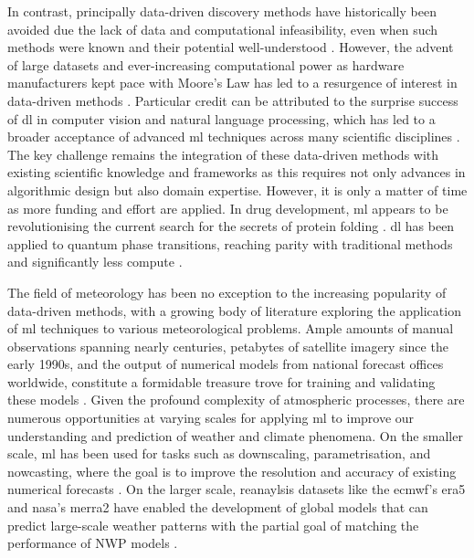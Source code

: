 In contrast, principally data-driven discovery methods have historically been avoided due the lack of data and computational infeasibility, even when such methods were known and their potential well-understood \citep{Rosenblatt1957,Rumelhart1986}. However, the advent of large datasets and ever-increasing computational power as hardware manufacturers kept pace with Moore's Law  has led to a resurgence of interest in data-driven methods \citep{Haber2025}. Particular credit can be attributed to the surprise success of \acrfull{dl} in computer vision and natural language processing, which has led to a broader acceptance of advanced \acrfull{ml} techniques across many scientific disciplines \citep{Haber2025,Krizhevsky2017}. The key challenge remains the integration of these data-driven methods with existing scientific knowledge and frameworks as this requires not only advances in algorithmic design but also domain expertise. However, it is only a matter of time as more funding and effort are applied. In drug development, \acrfull{ml} appears to be revolutionising the current search for the secrets of protein folding \citep{Jumper2021}. \acrshort{dl} has been applied to quantum phase transitions, reaching parity with traditional methods and significantly less compute \citep{Huembeli2018}.

The field of meteorology has been no exception to the increasing popularity of data-driven methods, with a growing body of literature exploring the application of \acrshort{ml} techniques to various meteorological problems. Ample amounts of manual observations spanning nearly centuries, petabytes of satellite imagery since the early 1990s, and the output of numerical models from national forecast offices worldwide, constitute a formidable treasure trove for training and validating these models \citep{Bracco2024,Waqas2024,Zhang2025}. Given the profound complexity of atmospheric processes, there are numerous opportunities at varying scales for applying \acrshort{ml} to improve our understanding and prediction of weather and climate phenomena. On the smaller scale, \acrshort{ml} has been used for tasks such as downscaling, parametrisation, and nowcasting, where the goal is to improve the resolution and accuracy of existing numerical forecasts \citep{Blunn2024,Zhang2023}. On the larger scale, reanaylsis datasets like the \acrfull{ecmwf}'s \acrfull{era5} and \acrfull{nasa}'s \acrfull{merra2} have enabled the development of global models that can predict large-scale weather patterns with the partial goal of matching the performance of NWP models \citep{Bracco2024,Gelaro2017,Hersbach2020,Zhang2025}.

